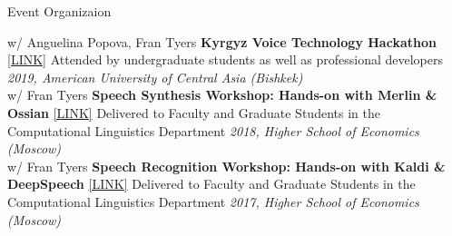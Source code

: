 \documentclass{resume} %
\begin{document}
\begin{minipage}{\textwidth}
\begin{rSection}{Event Organizaion}
\vspace{.25cm}

  {w/ Anguelina Popova, Fran Tyers} {\bf Kyrgyz Voice Technology Hackathon} {\href{https://jrmeyer.github.io/kyrgyz-voice-hackathon/}{[LINK]}} {Attended by undergraduate students as well as professional developers} \hfill {\em 2019, American University of Central Asia (Bishkek)} \\
  
  {w/ Fran Tyers} {\bf Speech Synthesis Workshop: Hands-on with Merlin \& Ossian} {\href{http://jrmeyer.github.io/tts/2016/12/09/tts-workshop.html}{[LINK]}} {Delivered to Faculty and Graduate Students in the Computational Linguistics Department} \hfill {\em 2018, Higher School of Economics (Moscow)} \\

  {w/ Fran Tyers} {\bf Speech Recognition Workshop: Hands-on with Kaldi \& DeepSpeech} {\href{http://jrmeyer.github.io/misc/stt-vishka.pdf}{[LINK]}} {Delivered to Faculty and Graduate Students in the Computational Linguistics Department} \hfill {\em 2017, Higher School of Economics (Moscow)} \\

\end{rSection}
\end{minipage}





\end{document}
